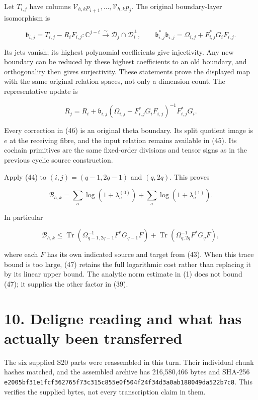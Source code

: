 \documentclass[
  11pt,
]{article}
\begin{document}
Let \(T_{i,j}\) have columns \(\mathcal V_{h,k}p_{i+1},\ldots,
\mathcal V_{h,k}p_j\). The original boundary-layer isomorphism is

\[
 \mathfrak b_{i,j}=T_{i,j}-R_iF_{i,j}:
 \mathbb C^{j-i}\xrightarrow{\sim}
 \mathcal D_j\cap\mathcal D_i^\perp,
 \qquad
 \mathfrak b_{i,j}^*\mathfrak b_{i,j}
 =\Omega_{i,j}+F_{i,j}^*G_iF_{i,j}.                                     \tag{45}
\]

Its jets vanish; its highest polynomial coefficients give injectivity.
Any new boundary can be reduced by these highest coefficients to an old
boundary, and orthogonality then gives surjectivity. These statements
prove the displayed map with the same original relation spaces, not only
a dimension count. The representative update is

\[
 R_j=R_i+
 \mathfrak b_{i,j}
 (\Omega_{i,j}+F_{i,j}^*G_iF_{i,j})^{-1}F_{i,j}^*G_i.                    \tag{46}
\]

Every correction in (46) is an original theta boundary. Its split
quotient image is \(e\) at the receiving fibre, and the input relation
remains available in (45). Its cochain primitives are the same
fixed-order divisions and tensor signs as in the previous cyclic source
construction.

Apply (44) to \((i,j)=(q-1,2q-1)\) and \((q,2q)\). This proves

\[
 \boxed{\mathcal B_{h,k}
 =\sum_a\log(1+\lambda_a^{(0)})
   +\sum_a\log(1+\lambda_a^{(1)}).}                                    \tag{47}
\]

In particular

\[
 \mathcal B_{h,k}\le
 \operatorname{Tr}(\Omega_{q-1,2q-1}^{-1}F^*G_{q-1}F)
 +\operatorname{Tr}(\Omega_{q,2q}^{-1}F^*G_qF),                          \tag{48}
\]

where each \(F\) has its own indicated source and target from (43). When
this trace bound is too large, (47) retains the full logarithmic cost
rather than replacing it by its linear upper bound. The analytic norm
estimate in (1) does not bound (47); it supplies the other factor in
(39).

\section{10. Deligne reading and what has actually been
transferred}\label{deligne-reading-and-what-has-actually-been-transferred}

The six supplied S20 parts were reassembled in this turn. Their
individual chunk hashes matched, and the assembled archive has
216,580,466 bytes and SHA-256
\texttt{e2005bf31e1fcf362765f73c315c855e0f504f24f34d3a0ab188049da522b7c8}.
This verifies the supplied bytes, not every transcription claim in them.
\end{document}
